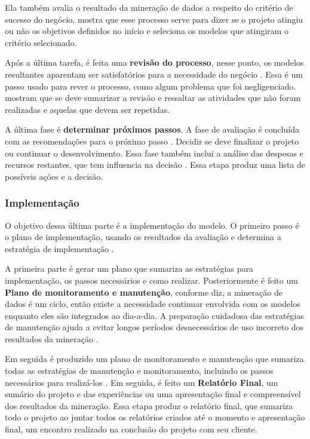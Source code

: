 Ela também avalia o resultado da mineração de dados a respeito do critério de sucesso do negócio,  mostra que esse processo serve para dizer se o projeto atingiu ou não os objetivos definidos no início e seleciona os modelos que atingiram o critério selecionado.

Após a última tarefa, é feita uma \textbf{revisão do processo}, nesse ponto, os modelos resultantes aparentam ser satisfatórios para a necessidade do negócio \citep{crispmanual}. Essa é um passo usado para rever o processo, como algum problema que foi negligenciado.  mostram que se deve sumarizar a revisão e ressaltar as atividades que não foram realizadas e aquelas que devem ser repetidas.

A última fase é \textbf{determinar próximos passos}. A fase de avaliação é concluída com as recomendações para o próximo passo \citep{dmfd}. Decidir se deve finalizar o projeto ou continuar o desenvolvimento. Essa fase também inclui a análise das despesas e recursos restantes, que tem influencia na decisão \citep{crispmanual}.
Essa etapa produz uma lista de possíveis ações e a decisão.

\subsubsection{Implementação}
O objetivo dessa última parte é a implementação do modelo.
O primeiro passo é o plano de implementação, usando os resultados da avaliação e determina a estratégia de implementação \citep{crispmanual}. 

A primeira parte é gerar um plano que sumariza as estratégias para implementação, os passos necessários e como realizar.
Posteriormente é feito um \textbf{Plano de monitoramento e manutenção}, conforme  diz, a mineração de dados é um ciclo, então existe a necessidade continuar envolvida com os modelos enquanto eles são integrados ao dia-a-dia. A preparação cuidadosa das estratégias de manutenção ajuda a evitar longos períodos desnecessários de uso incorreto dos resultados da mineração \citep{crispmanual}.

Em seguida é produzido um plano de monitoramento e manutenção que sumariza todas as estratégias de manutenção e monitoramento, incluindo os passos necessários para realizá-los \citep{crispmanual}.
Em seguida, é feito um \textbf{Relatório Final}, um sumário do projeto e das experiências ou uma apresentação final e compreensível dos resultados da mineração.
Essa etapa produz o relatório final, que sumariza todo o projeto ao juntar todos os relatórios criados até o momento \citep{dmfd} e apresentação final, um encontro realizado na conclusão do projeto com seu cliente.

